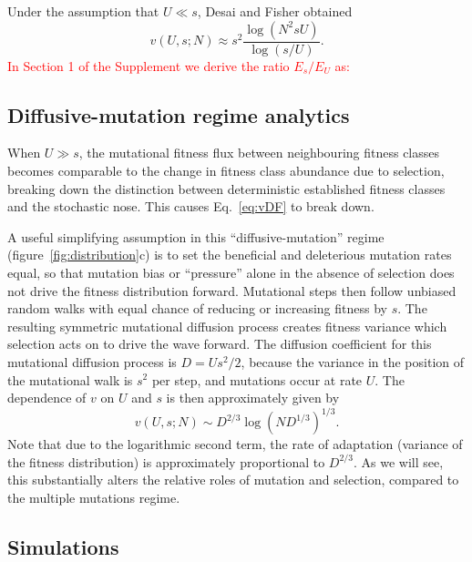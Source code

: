 \documentclass[9pt,twocolumn,twoside]{article}
\begin{document}
Under the assumption that $U\ll s$, Desai and Fisher \citep[][Eq.~41]{desai2007beneficial} obtained
\begin{equation} \label{eq:vDF}
v(U,s;N)\approx s^2\frac{\log(N^2sU)}{\log(s/U)}.
\end{equation}
\textcolor{red}{In Section 1 of the Supplement we derive the ratio $E_s/E_U$ as:
}
\subsection{Diffusive-mutation regime analytics}\label{subsec:materials:dmanalytics}

When $U \gg s$, the mutational fitness flux between neighbouring fitness classes  becomes comparable to the change in fitness class abundance due to selection, breaking down the distinction between deterministic established fitness classes and the stochastic nose. This causes Eq.~\eqref{eq:vDF} to break down.

A useful simplifying assumption in this ``diffusive-mutation'' regime (figure~\ref{fig:distribution}c) is to set the beneficial and deleterious mutation rates equal, so that mutation bias or ``pressure'' \citep{fisher1930genetical,haldane1932causes} alone in the absence of selection does not drive the fitness distribution forward. Mutational steps then follow unbiased random walks with equal chance of reducing or increasing fitness by $s$. The resulting symmetric mutational diffusion process creates fitness variance which selection acts on to drive the wave forward. The diffusion coefficient for this mutational diffusion process is $D=Us^2/2$, because the variance in the position of the mutational walk is $s^2$ per step, and mutations occur at rate $U$. The dependence of $v$ on $U$ and $s$ is then approximately given by \citep[Appendix F in ref][]{hallatschek2011noisy}
\begin{equation}\label{eq:vHallatschek}
v(U,s; N) \sim D^{2/3} \log\left(N D^{1/3} \right)^{1/3}. 
\end{equation}
Note that due to the logarithmic second term, the rate of adaptation (variance of the fitness distribution) is approximately proportional to $D^{2/3}$. As we will see, this substantially alters the relative roles of mutation and selection, compared to the multiple mutations regime.  

\subsection{Simulations} \label{subsec:materials:simulations}
\end{document}
